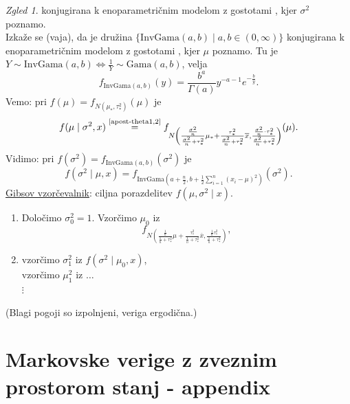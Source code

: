 \documentclass[a4paper, 12pt]{book}
\theoremstyle{definition}
\theoremstyle{remark}
\newtheorem*{exmp}{Zgled}
\begin{document}
\begin{exmp}
  konjugirana k enoparametričnim modelom z gostotami , kjer $\sigma^2$ poznamo. \\
  Izkaže se (vaja), da je družina $\{\text{InvGama}(a,b) \mid a,b \in (0, \infty)\}$
  konjugirana k enoparametričnim modelom z gostotami , kjer $\mu$ poznamo.
  Tu je $Y \sim \text{InvGama}(a,b) \iff \frac{1}{Y} \sim \text{Gama}(a,b)$, velja
  \begin{equation*}
    f_{\text{InvGama}(a,b)}(y) = \frac{b^a}{\Gamma(a)} y^{-a-1} e^{-\frac{b}{y}}.
  \end{equation*}
  Vemo: pri $f(\mu) = f_{N(\mu_{*}, \tau_{*}^2)}(\mu)$ je
  \begin{equation*}
    f(\mu \mid \sigma^2, x) \stackrel{\refeq{apost-theta1,2}}{=}
      f_{N\left(\frac{\frac{\sigma^2}{n}}{\frac{\sigma^2}{n} + \tau_{*}^2} \mu_{*} + 
                \frac{\tau_{*}^2}{\frac{\sigma^2}{n} + \tau_{*}^2} \overline{x},
                \frac{\frac{\sigma^2}{n} \cdot \tau_{*}^2}{\frac{\sigma^2}{n} + \tau_{*}^2}\right)}(\mu).
  \end{equation*}
  Vidimo: pri $f(\sigma^2) = f_{\text{InvGama}(a,b)}(\sigma^2)$ je
  \begin{equation*}
    f(\sigma^2 \mid \mu, x) =
      f_{\text{InvGama}\left(a+\frac{n}{2}, b+\frac{1}{2}\sum_{i=1}^{n}(x_i-\mu)^2\right)}(\sigma^2).
  \end{equation*}
  \underline{Gibsov vzorčevalnik}: ciljna porazdelitev $f(\mu, \sigma^2 \mid x)$.
  \begin{enumerate}[label=(\roman*)]
    \item Določimo $\sigma_0^2 = 1$. Vzorčimo $\mu_0$ iz
      \begin{equation*}
        f_{N\left(\frac{\frac{1}{n}}{\frac{1}{n} + \tau_{*}^2} \mu +
                  \frac{\tau_{*}^2}{\frac{1}{n} + \tau_{*}^2} \overline{x},
                  \frac{\frac{1}{n} \tau_{*}^2}{\frac{1}{n} + \tau_{*}^2}\right)},
      \end{equation*}
    \item vzorčimo $\sigma_1^2$ iz $f(\sigma^2 \mid \mu_0, x)$, \\
      vzorčimo $\mu_1^2$ iz $\dots$ \\
      $\vdots$
  \end{enumerate}
  (Blagi pogoji so izpolnjeni, veriga ergodična.)
\end{exmp}



\section{Markovske verige z zveznim prostorom stanj - appendix}
\end{document}
